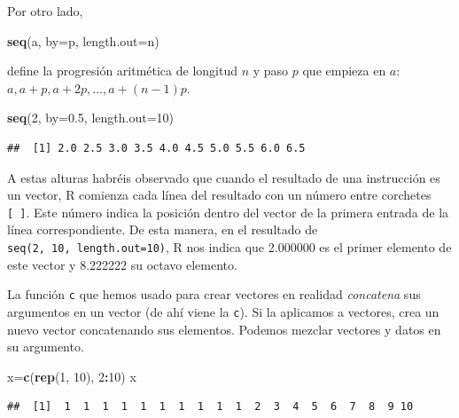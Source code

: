 \documentclass[]{book}
\newenvironment{Shaded}{\begin{snugshade}}{\end{snugshade}}
\newcommand{\DataTypeTok}[1]{\textcolor[rgb]{0.13,0.29,0.53}{#1}}
\newcommand{\DecValTok}[1]{\textcolor[rgb]{0.00,0.00,0.81}{#1}}
\newcommand{\FloatTok}[1]{\textcolor[rgb]{0.00,0.00,0.81}{#1}}
\newcommand{\KeywordTok}[1]{\textcolor[rgb]{0.13,0.29,0.53}{\textbf{#1}}}
\newcommand{\NormalTok}[1]{#1}
\newcommand{\OperatorTok}[1]{\textcolor[rgb]{0.81,0.36,0.00}{\textbf{#1}}}
\theoremstyle{definition}
\theoremstyle{definition}
\theoremstyle{definition}
\theoremstyle{remark}
\begin{document}
Por otro lado,

\begin{Shaded}
\begin{Highlighting}[]
\KeywordTok{seq}\NormalTok{(a, }\DataTypeTok{by=}\NormalTok{p, }\DataTypeTok{length.out=}\NormalTok{n)}
\end{Highlighting}
\end{Shaded}

define la progresión aritmética de longitud \(n\) y paso \(p\) que empieza en \(a\):
\(a, a+p, a+2p, \ldots, a+(n-1)p\).

\begin{Shaded}
\begin{Highlighting}[]
\KeywordTok{seq}\NormalTok{(}\DecValTok{2}\NormalTok{, }\DataTypeTok{by=}\FloatTok{0.5}\NormalTok{, }\DataTypeTok{length.out=}\DecValTok{10}\NormalTok{)}
\end{Highlighting}
\end{Shaded}

\begin{verbatim}
##  [1] 2.0 2.5 3.0 3.5 4.0 4.5 5.0 5.5 6.0 6.5
\end{verbatim}

A estas alturas habréis observado que cuando el resultado de una instrucción es un vector, R comienza cada línea del resultado con un número entre corchetes \texttt{{[}\ {]}}. Este número indica la posición dentro del vector de la primera entrada de la línea correspondiente. De esta manera, en el resultado de \texttt{seq(2,\ 10,\ length.out=10)}, R nos indica que 2.000000 es el primer elemento de este vector y 8.222222 su octavo elemento.

La función \texttt{c} que hemos usado para crear vectores en realidad \emph{concatena} sus argumentos en un vector (de ahí viene la \texttt{c}). Si la aplicamos a vectores, crea un nuevo vector concatenando sus elementos. Podemos mezclar vectores y datos en su argumento.

\begin{Shaded}
\begin{Highlighting}[]
\NormalTok{x=}\KeywordTok{c}\NormalTok{(}\KeywordTok{rep}\NormalTok{(}\DecValTok{1}\NormalTok{, }\DecValTok{10}\NormalTok{), }\DecValTok{2}\OperatorTok{:}\DecValTok{10}\NormalTok{)}
\NormalTok{x}
\end{Highlighting}
\end{Shaded}

\begin{verbatim}
##  [1]  1  1  1  1  1  1  1  1  1  1  2  3  4  5  6  7  8  9 10
\end{verbatim}
\end{document}
